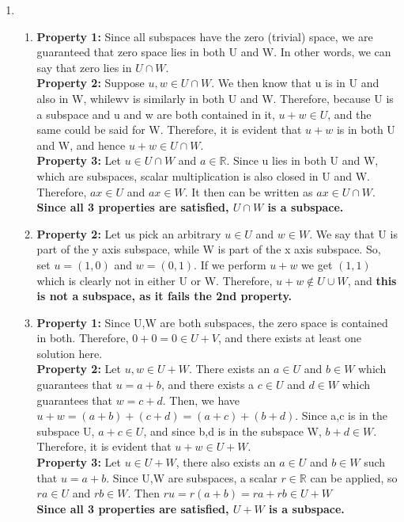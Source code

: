 \documentclass{article}
\begin{document}
\begin{enumerate}
\begin{enumerate}
\end{enumerate}

\item

\begin{enumerate}

\item 
\textbf{Property 1:} Since all subspaces have the zero (trivial) space, we are guaranteed that zero space lies in both U and W. In other words, we can say that zero lies in $U \cap W$. \\ 
\textbf{Property 2:} Suppose $u,w \in U \cap W$. We then know that u is in U and also in W, whilewv is similarly in both U and W. Therefore, because U is a subspace and u and w are both contained in it, $u + w \in U$, and the same could be said for W. Therefore, it is evident that $u + w$ is in both U and W, and hence $u + w \in U \cap W$. \\
\textbf{Property 3:} Let $u \in U \cap W$ and $a \in \mathbb{R}$. Since u lies in both U and W, which are subspaces, scalar multiplication is also closed in U and W. Therefore, $ax \in U$ and $ax \in W$. It then can be written as $ax \in U \cap W$. \\ \textbf{Since all 3 properties are satisfied, $U \cap W$ is a subspace.}

\item
\textbf{Property 2:} Let us pick an arbitrary $u \in U$ and $w \in W$. We say that U is part of the y axis subspace, while W is part of the x axis subspace. So, set $u = (1,0)$ and $w = (0,1)$. If we perform $u + w$ we get $(1,1)$ which is clearly not in either U or W. Therefore, $u + w \notin U \cup W$, and \textbf{this is not a subspace, as it fails the 2nd property.}

\item
\textbf{Property 1:} Since U,W are both subspaces, the zero space is contained in both. Therefore, $0 + 0 = 0 \in U + V$, and there exists at least one solution here. \\
\textbf{Property 2:} Let $u,w \in U + W$. There exists an $a \in U$ and $b \in W$ which guarantees that $u = a + b$, and there exists a $c \in U$ and $d \in W$ which guarantees that $w = c + d$. Then, we have $u + w = (a + b) + (c + d) = (a + c) + (b + d)$. Since a,c is in the subspace U, $a + c \in U$, and since b,d is in the subspace W, $b + d \in W$. Therefore, it is evident that $u + w \in U + W$.\\
\textbf{Property 3:} Let $u \in U + W$, there also exists an $a \in U$ and $b \in W$ such that $u = a + b$. Since U,W are subspaces, a scalar $r \in  \mathbb{R}$ can be applied, so $ra \in U$ and $rb \in W$. Then $ru = r(a + b) = ra + rb \in U + W$ \\ \textbf{Since all 3 properties are satisfied, $U + W$ is a subspace.}


\end{enumerate}
\end{enumerate}
\end{document}
